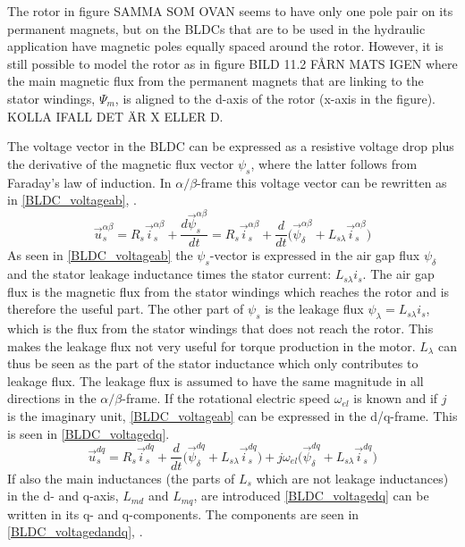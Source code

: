 \documentclass{LTHthesis}
\begin{document}
The rotor in figure SAMMA SOM OVAN seems to have only one pole pair on its permanent magnets, but on the BLDCs that are to be used in the hydraulic application have magnetic poles equally spaced around the rotor. However, it is still possible to model the rotor as in figure BILD 11.2 FÅRN MATS IGEN where the main magnetic flux from the permanent magnets that are linking to the stator windings, $\Psi_m$, is aligned to the d-axis of the rotor (x-axis in the figure). KOLLA IFALL DET ÄR X ELLER D.

The voltage vector in the BLDC can be expressed as a resistive voltage drop plus the derivative of the magnetic flux vector $\psi_s$, where the latter follows from Faraday's law of induction. In $\alpha/\beta$-frame this voltage vector can be rewritten as in \eqref{BLDC_voltageab}, \cite{ala_kar2014}.
\begin{equation} \label{BLDC_voltageab}
\vec{u}_s^{\alpha\beta}=R_s\vec{i}_s^{\alpha\beta}+\frac{d\vec{\psi}_s^{\alpha\beta}}{dt}=R_s\vec{i}_s^{\alpha\beta}+\frac{d}{dt}\big(\vec{\psi}_\delta^{\alpha\beta}+L_{s\lambda}\vec{i}_s^{\alpha\beta}\big)
\end{equation}
As seen in \eqref{BLDC_voltageab} the $\psi_s$-vector is expressed in the air gap flux $\psi_\delta$ and the stator leakage inductance times the stator current: $L_{s\lambda}i_s$. The air gap flux is the magnetic flux from the stator windings which reaches the rotor and is therefore the useful part. The other part of $\psi_s$ is the leakage flux $\psi_\lambda=L_{s\lambda}i_s$, which is the flux from the stator windings that does not reach the rotor. This makes the leakage flux not very useful for torque production in the motor. $L_\lambda$ can thus be seen as the part of the stator inductance which only contributes to leakage flux. The leakage flux is assumed to have the same magnitude in all directions in the $\alpha/\beta$-frame. If the rotational electric speed $\omega_{el}$ is known and if $j$ is the imaginary unit, \eqref{BLDC_voltageab} can be expressed in the d/q-frame. This is seen in \eqref{BLDC_voltagedq}.
\begin{equation} \label{BLDC_voltagedq}
\vec{u}_s^{dq}=R_s\vec{i}_s^{dq}+\frac{d}{dt}\big(\vec{\psi}_\delta^{dq}+L_{s\lambda}\vec{i}_s^{dq}\big)+j\omega_{el}\big(\vec{\psi}_\delta^{dq}+L_{s\lambda}\vec{i}_s^{dq}\big)
\end{equation}
If also the main inductances (the parts of $L_s$ which are not leakage inductances) in the d- and q-axis, $L_{md}$ and $L_{mq}$, are introduced \eqref{BLDC_voltagedq} can be written in its q- and q-components. The components are seen in \eqref{BLDC_voltagedandq}, \cite{ala_kar2014}.
\end{document}
